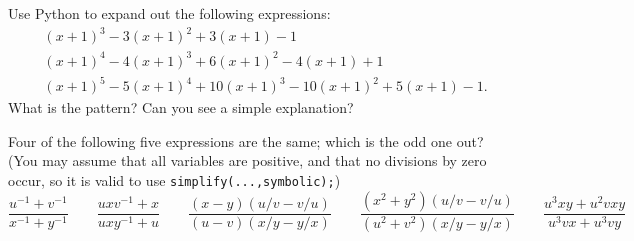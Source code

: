 \documentclass[a4paper,10pt]{amsbook}
\begin{document}
\begin{exercise}\label{ex-expand-unshift}
 Use Python to expand out the following expressions:
 \begin{align*}
  & (x+1)^3 - 3(x+1)^2 + 3(x+1) - 1 \\
  & (x+1)^4 - 4(x+1)^3 + 6(x+1)^2 - 4(x+1) + 1 \\
  & (x+1)^5 - 5(x+1)^4 + 10(x+1)^3 - 10(x+1)^2 + 5(x+1) - 1.
 \end{align*}
 What is the pattern?  Can you see a simple explanation?
\end{exercise}

\begin{exercise}\label{ex-oddone}
 Four of the following five expressions are the same; which is the odd
 one out?  (You may assume that all variables are positive, and that no
 divisions by zero occur, so it is valid to use
 \verb+simplify(...,symbolic);+)
 \[ 
  \frac{u^{-1}+v^{-1}}{x^{-1}+y^{-1}}            \hspace{2em}
  \frac{uxv^{-1} + x}{uxy^{-1} + u}              \hspace{2em}
  \frac{(x-y)(u/v-v/u)}{(u-v)(x/y-y/x)}          \hspace{2em}
  \frac{(x^2+y^2)(u/v-v/u)}{(u^2+v^2)(x/y-y/x)}  \hspace{2em}
  \frac{u^3xy+u^2vxy}{u^3vx+u^3vy}
 \]
\end{exercise}
\end{document}
